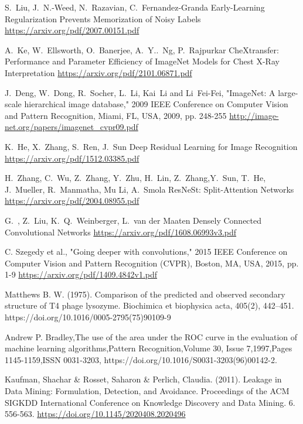 \documentclass[journal, a4paper]{IEEEtran}
\begin{document}
\begin{thebibliography}{5}
			    
	S.~Liu, J.~N.-Weed, N.~Razavian, C.~Fernandez-Granda
	Early-Learning Regularization Prevents Memorization of Noisy Labels
	\url{https://arxiv.org/pdf/2007.00151.pdf}
			    
			    
	A.~Ke, W.~Ellsworth, O.~Banerjee, A.~Y..~Ng, P.~Rajpurkar
	CheXtransfer: Performance and Parameter Efficiency of ImageNet Models for Chest X-Ray Interpretation
	\url{https://arxiv.org/pdf/2101.06871.pdf}
			    
			    
	J.~Deng, W.~Dong, R.~Socher, L.~Li, Kai~Li and Li~Fei-Fei, "ImageNet: A large-scale hierarchical image database," 2009 IEEE Conference on Computer Vision and Pattern Recognition, Miami, FL, USA, 2009, pp. 248-255
	\url{http://image-net.org/papers/imagenet_cvpr09.pdf}
			    
	K.~He, X.~Zhang, S.~Ren, J.~Sun
	Deep Residual Learning for Image Recognition
	\url{https://arxiv.org/pdf/1512.03385.pdf}
			    
			    
	H.~Zhang, C.~Wu, Z.~Zhang, Y.~Zhu, H.~Lin, Z.~Zhang,Y.~Sun, T.~He, J.~Mueller, R.~Manmatha, Mu Li, A.~Smola
	ResNeSt: Split-Attention Networks
	\url{https://arxiv.org/pdf/2004.08955.pdf}
			    
			    
	G.~, Z.~Liu, K.~Q.~Weinberger, L.~van der Maaten
	Densely Connected Convolutional Networks
	\url{https://arxiv.org/pdf/1608.06993v3.pdf}
			    
			    
	C. Szegedy et al., "Going deeper with convolutions," 2015 IEEE Conference on Computer Vision and Pattern Recognition (CVPR), Boston, MA, USA, 2015, pp. 1-9
	\url{https://arxiv.org/pdf/1409.4842v1.pdf}
	    
	Matthews B. W. (1975). Comparison of the predicted and observed secondary structure of T4 phage lysozyme. Biochimica et biophysica acta, 405(2), 442–451. https://doi.org/10.1016/0005-2795(75)90109-9
			    
			    
	Andrew P. Bradley,The use of the area under the ROC curve in the evaluation of machine learning algorithms,Pattern Recognition,Volume 30, Issue 7,1997,Pages 1145-1159,ISSN 0031-3203,
	https://doi.org/10.1016/S0031-3203(96)00142-2.
			
			    
	Kaufman, Shachar & Rosset, Saharon & Perlich, Claudia. (2011). Leakage in Data Mining: Formulation, Detection, and Avoidance. Proceedings of the ACM SIGKDD International Conference on Knowledge Discovery and Data Mining. 6. 556-563.
	\url{https://doi.org/10.1145/2020408.2020496}
			    

\end{thebibliography}
\end{document}
